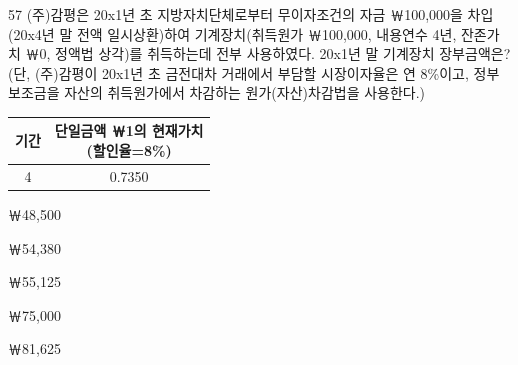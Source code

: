 \begin{question}{57}
(주)감평은 20x1년 초 지방자치단체로부터 무이자조건의 자금 ￦100,000을 차입(20x4년 말 전액 일시상환)하여 기계장치(취득원가 ￦100,000, 내용연수 4년, 잔존가치 ￦0, 정액법 상각)를 취득하는데 전부 사용하였다. 20x1년 말 기계장치 장부금액은? (단, (주)감평이 20x1년 초 금전대차 거래에서 부담할 시장이자율은 연 8\%이고, 정부보조금을 자산의 취득원가에서 차감하는 원가(자산)차감법을 사용한다.)
\par{\small\centering\begin{tabular}{|c|c|}\hline
기간 & \makecell{단일금액 ￦1의 현재가치\\(할인율=8\%)} \\ \hline
4 & 0.7350 \\ \hline
\end{tabular}\par}
\begin{choices}
  \item ￦48,500
  \item ￦54,380
  \item ￦55,125
  \item ￦75,000
  \item ￦81,625
\end{choices}
\end{question}

